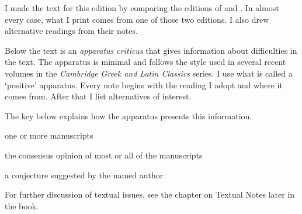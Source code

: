 I made the text for this edition by comparing the editions of \citet{sb1985} and \citet{mankin1995}. In almost every case, what I print comes from one of those two editions. I also drew alternative readings from their notes.

Below the text is an \textit{apparatus criticus} that gives information about difficulties in the text.  The apparatus is minimal and follows the style used in several recent volumes in the \textit{Cambridge Greek and Latin Classics} series.  I use what is called a `positive' apparatus.  Every note begins with the reading I adopt and where it comes from.  After that I list alternatives of interest.  

The key below explains how the apparatus presents this information.

\begin{description}%
    [style=sameline,leftmargin=70pt,labelwidth=\widthof{\textbf{Name}}]
    \item[m] one or more manuscripts
    \item[M] the consensus opinion of most or all of the manuscripts
    \item[Name] a conjecture suggested by the named author
\end{description}

For further discussion of textual issues, see the chapter on Textual Notes later in the book.


